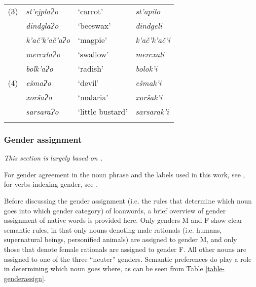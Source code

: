 \begin{longtable}{llll}
            		\midrule
                    
		(3) & \textit{st'ejplaɁo} & `carrot' & \textit{st'apilo} \\
		& \textit{dindglaɁo} & `beeswax' & \textit{dindgeli} \\
		& \textit{k'ač'k'ač'aɁo} & `magpie' & \textit{k'ač'k'ač'i} \\
		& \textit{mercxlaɁo} & `swallow' & \textit{mercxali} \\
		& \textit{bolk'aɁo} & `radish' & \textit{bolok'i} \\
		
		\midrule
        
		(4) & \textit{ešmaɁo} & `devil' & \textit{ešmak'i} \\
		& \textit{xoršaɁo} & `malaria' & \textit{xoršak'i} \\
		& \textit{sarsaraɁo} & `little bustard' & \textit{sarsarak'i} \\
        
        \lspbottomrule
	\end{longtable}

\subsubsection{Gender assignment} \label{genderadapt}

\hspace*{\fill} \textit{This section is largely based on \textcite{WS}.}

\medskip

For gender agreement in the noun phrase and the labels used in this work, see , for verbs indexing gender, see .




Before discussing the gender assignment (i.e. the rules that determine which noun goes into which gender category) of loanwords, a brief overview of gender assignment of native words is provided here.
Only genders M and F show clear semantic rules, in that only nouns denoting male rationals (i.e. humans, supernatural beings, personified animals) are assigned to gender M, and only those that denote female rationals are assigned to gender F. All other nouns are assigned to one of the three ``neuter'' genders. Semantic preferences do play a role in determining which noun goes where, as can be seen from Table \ref{table-genderassign}.

